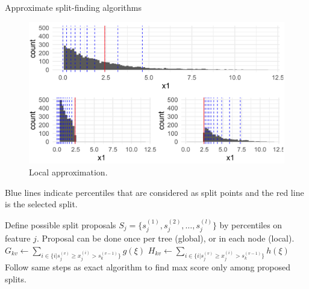 \begin{vbframe}{Approximate split-finding algorithms}
\begin{small}
\begin{minipage}[b]{0.49\textwidth}
\end{minipage}
\begin{minipage}[b]{0.49\textwidth}
  \begin{figure}
    \includegraphics[width=\textwidth]{figure_man/split-finding02.png}
    \caption*{Local approximation.}
  \end{figure}
\end{minipage}
\end{small}

\lz

Blue lines indicate percentiles that are considered as split points and the red line is the selected split.

\framebreak

\begin{algorithm}[H]
\begin{footnotesize}
\begin{center}
  \begin{algorithmic}[1]
      \State Define possible split proposals $S_j = \{s_{j}^{(1)}, s_{j}^{(2)}, \hdots, s_{j}^{(l)}\}$ by percentiles on feature $j$.
      \State Proposal can be done once per tree (global), or in each node (local).
    \EndFor
      \State ${G}_{kv} \gets \sum_{i \in \{i|s_j^{(v)} \geq x_j^{(i)} > s_{k}^{(v - 1)}\}} g(\xi)$
      \State ${H}_{kv} \gets \sum_{i \in \{i|s_j^{(v)} \geq x_j^{(i)} > s_{k}^{(v - 1)}\}} h(\xi)$
    \EndFor
    \State Follow same steps as exact algorithm to find max score only among proposed splits.
  \end{algorithmic}
\end{center}
\end{footnotesize}
\caption{Approximate algorithm for split finding}
\end{algorithm}

\end{vbframe}

